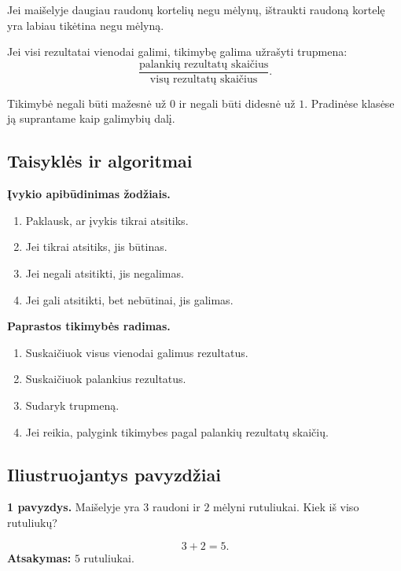 \begin{savybe}
Jei maišelyje daugiau raudonų kortelių negu mėlynų, ištraukti raudoną kortelę yra labiau tikėtina negu mėlyną.
\end{savybe}

\begin{savybe}
Jei visi rezultatai vienodai galimi, tikimybę galima užrašyti trupmena:
\[
\frac{\text{palankių rezultatų skaičius}}{\text{visų rezultatų skaičius}}.
\]
\end{savybe}

\begin{savybe}
Tikimybė negali būti mažesnė už \(0\) ir negali būti didesnė už \(1\). Pradinėse klasėse ją suprantame kaip galimybių dalį.
\end{savybe}

\subsection{Taisyklės ir algoritmai}

\textbf{Įvykio apibūdinimas žodžiais.}
\begin{enumerate}[label=\arabic*.]
\item Paklausk, ar įvykis tikrai atsitiks.
\item Jei tikrai atsitiks, jis būtinas.
\item Jei negali atsitikti, jis negalimas.
\item Jei gali atsitikti, bet nebūtinai, jis galimas.
\end{enumerate}

\textbf{Paprastos tikimybės radimas.}
\begin{enumerate}[label=\arabic*.]
\item Suskaičiuok visus vienodai galimus rezultatus.
\item Suskaičiuok palankius rezultatus.
\item Sudaryk trupmeną.
\item Jei reikia, palygink tikimybes pagal palankių rezultatų skaičių.
\end{enumerate}

\subsection{Iliustruojantys pavyzdžiai}

\textbf{1 pavyzdys.} Maišelyje yra \(3\) raudoni ir \(2\) mėlyni rutuliukai. Kiek iš viso rutuliukų?

\[
3+2=5.
\]
\textbf{Atsakymas:} \(5\) rutuliukai.

